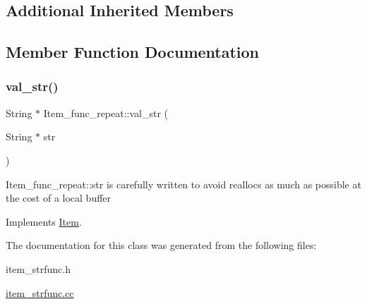 \subsection*{Additional Inherited Members}


\subsection{Member Function Documentation}
\mbox{\label{classItem__func__repeat_a9c6307db82de8955ae52be83b3da8fd7}} 
\subsubsection{\texorpdfstring{val\+\_\+str()}{val\_str()}}
{\footnotesize\ttfamily String $\ast$ Item\+\_\+func\+\_\+repeat\+::val\+\_\+str (\begin{DoxyParamCaption}\item[{String $\ast$}]{str }\end{DoxyParamCaption})\hspace{0.3cm}{\ttfamily [virtual]}}

Item\+\_\+func\+\_\+repeat\+::str is carefully written to avoid reallocs as much as possible at the cost of a local buffer 

Implements \mbox{\hyperlink{classItem}{Item}}.



The documentation for this class was generated from the following files\+:\begin{DoxyCompactItemize}
\item 
item\+\_\+strfunc.\+h\item 
\mbox{\hyperlink{item__strfunc_8cc}{item\+\_\+strfunc.\+cc}}\end{DoxyCompactItemize}
